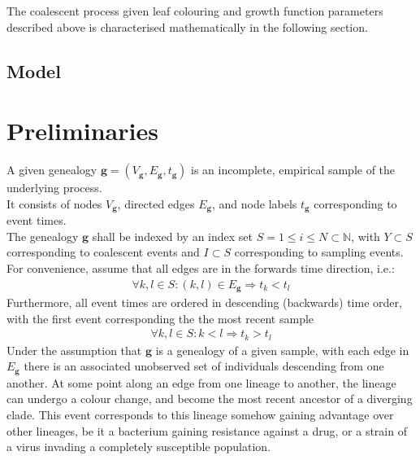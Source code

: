 \documentclass{report}
\newcommand{\N}{\mathbb{N}}
\theoremstyle{definition}
\begin{document}
The coalescent process given leaf colouring and growth function parameters described above is characterised mathematically in the following section.
\subsection{Model}
\section{Preliminaries}
A given genealogy $\mathbf{g}=(V_\mathbf{g}, E_\mathbf{g}, t_\mathbf{g})$ is an incomplete, empirical sample of the underlying process.\\
It consists of nodes $V_\mathbf{g}$, directed edges $E_\mathbf{g}$, and node labels $t_\mathbf{g}$ corresponding to event times.\\
The genealogy $\mathbf{g}$ shall be indexed by an index set $S=1\leq i \leq N\subset \N$, with $Y\subset S$ corresponding to coalescent events and $I\subset S$ corresponding to sampling events.\\
For convenience, assume that all edges are in the forwards time direction, i.e.: 
\begin{gather*}
\forall k,l \in S: (k,l)\in E_\mathbf{g} \Rightarrow t_k<t_l
\end{gather*}
Furthermore, all event times are ordered in descending (backwards) time order, with the first event corresponding the the most recent sample
\begin{gather*}
\forall k,l \in S: k<l \Rightarrow t_k > t_l
\end{gather*}
Under the assumption that $\mathbf{g}$ is a genealogy of a given sample, with each edge in $E_\mathbf{g}$ there is an associated unobserved set of individuals descending from one another. At some point along an edge from one lineage to another, the lineage can undergo a colour change, and become the most recent ancestor of a diverging clade. This event corresponds to this lineage somehow gaining advantage over other lineages, be it a bacterium gaining resistance against a drug, or a strain of a virus invading a completely susceptible population.
\end{document}
